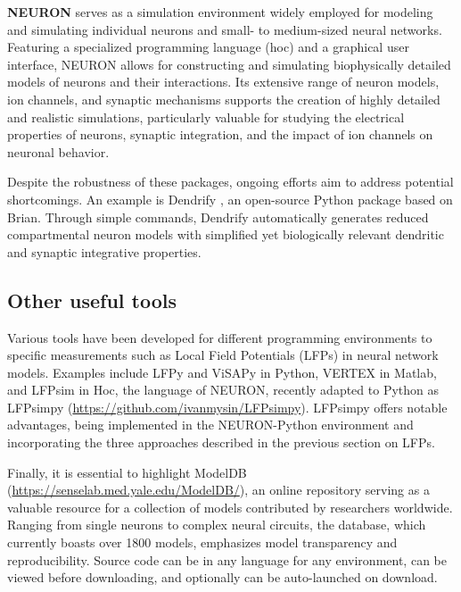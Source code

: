 \documentclass[../main.tex]{subfiles}
\begin{document}
\textbf{NEURON} serves as a simulation environment widely employed for modeling and simulating individual neurons and small- to medium-sized neural networks.
Featuring a specialized programming language (hoc) and a graphical user interface, NEURON allows for constructing and simulating biophysically detailed models of neurons and their interactions.
Its extensive range of neuron models, ion channels, and synaptic mechanisms supports the creation of highly detailed and realistic simulations, particularly valuable for studying the electrical properties of neurons, synaptic integration, and the impact of ion channels on neuronal behavior.

Despite the robustness of these packages, ongoing efforts aim to address potential shortcomings.
An example is Dendrify \citep{pagkalos2023introducing}, an open-source Python package based on Brian.
Through simple commands, Dendrify automatically generates reduced compartmental neuron models with simplified yet biologically relevant dendritic and synaptic integrative properties.

\subsection{Other useful tools}
Various tools have been developed for different programming environments to specific measurements such as Local Field Potentials (LFPs) in neural network models.
Examples include LFPy \citep{linden_lfpy_2014} and ViSAPy \citep{hagen_visapy_2015} in Python, VERTEX \citep{tomsett_virtual_2015} in Matlab, and LFPsim \citep{parasuram_computational_2016} in Hoc, the language of NEURON, recently adapted to Python as LFPsimpy (\url{https://github.com/ivanmysin/LFPsimpy}). LFPsimpy offers notable advantages, being implemented in the NEURON-Python environment and incorporating the three approaches described in the previous section on LFPs.

Finally, it is essential to highlight ModelDB \citep{hines_neuron_2009} (\url{https://senselab.med.yale.edu/ModelDB/}), an online repository serving as a valuable resource for a collection of models contributed by researchers worldwide.
Ranging from single neurons to complex neural circuits, the database, which currently boasts over 1800 models, emphasizes model transparency and reproducibility.
Source code can be in any language for any environment, can be viewed before downloading, and optionally can be auto-launched on download.
\end{document}
